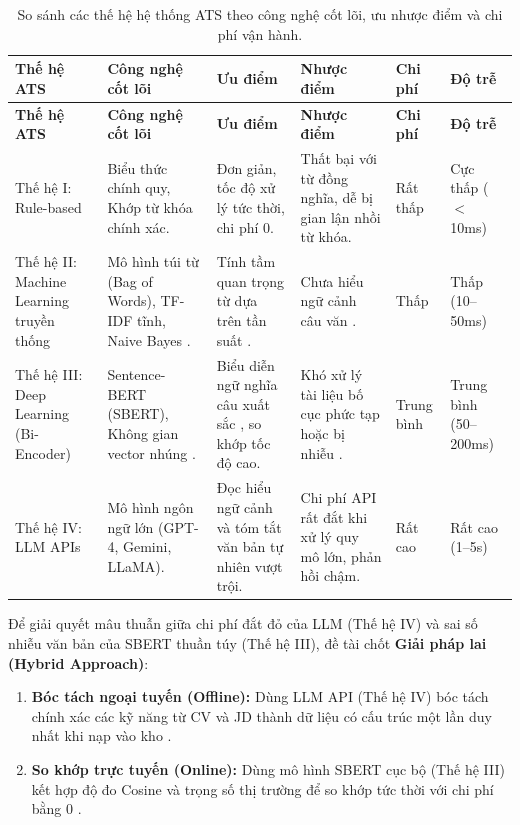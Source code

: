 \begingroup
\footnotesize
\begin{longtable}{|L{1.8cm}|L{2.3cm}|L{2.6cm}|L{2.6cm}|L{1.5cm}|L{1.6cm}|}
\caption{So sánh các thế hệ hệ thống ATS theo công nghệ cốt lõi, ưu nhược điểm và chi phí vận hành.}
\label{tab:ats_generations} \\
\hline
\textbf{Thế hệ ATS} & \textbf{Công nghệ cốt lõi} & \textbf{Ưu điểm} & \textbf{Nhược điểm} & \textbf{Chi phí} & \textbf{Độ trễ} \\
\hline
\endfirsthead
\hline
\textbf{Thế hệ ATS} & \textbf{Công nghệ cốt lõi} & \textbf{Ưu điểm} & \textbf{Nhược điểm} & \textbf{Chi phí} & \textbf{Độ trễ} \\
\hline
\endhead
Thế hệ I: Rule-based &
Biểu thức chính quy, Khớp từ khóa chính xác. &
Đơn giản, tốc độ xử lý tức thời, chi phí 0. &
Thất bại với từ đồng nghĩa, dễ bị gian lận nhồi từ khóa. &
Rất thấp &
Cực thấp ($<$10ms) \\
\hline
Thế hệ II: Machine Learning truyền thống &
Mô hình túi từ (Bag of Words), TF-IDF tĩnh, Naive Bayes \cite{manning2008}. &
Tính tầm quan trọng từ dựa trên tần suất \cite{manning2008}. &
Chưa hiểu ngữ cảnh câu văn \cite{reimers2019}. &
Thấp &
Thấp (10--50ms) \\
\hline
Thế hệ III: Deep Learning (Bi-Encoder) &
Sentence-BERT (SBERT), Không gian vector nhúng \cite{reimers2019}. &
Biểu diễn ngữ nghĩa câu xuất sắc \cite{minilmmodel}, so khớp tốc độ cao. &
Khó xử lý tài liệu bố cục phức tạp hoặc bị nhiễu \cite{reimers2019}. &
Trung bình &
Trung bình (50--200ms) \\
\hline
Thế hệ IV: LLM APIs &
Mô hình ngôn ngữ lớn (GPT-4, Gemini, LLaMA). &
Đọc hiểu ngữ cảnh và tóm tắt văn bản tự nhiên vượt trội. &
Chi phí API rất đắt khi xử lý quy mô lớn, phản hồi chậm. &
Rất cao &
Rất cao (1--5s) \\
\hline
\end{longtable}
\endgroup

Để giải quyết mâu thuẫn giữa chi phí đắt đỏ của LLM (Thế hệ IV) và sai số nhiễu văn bản của SBERT thuần túy (Thế hệ III), đề tài chốt \textbf{Giải pháp lai (Hybrid Approach)}:
\begin{enumerate}
    \item \textbf{Bóc tách ngoại tuyến (Offline):} Dùng LLM API (Thế hệ IV) bóc tách chính xác các kỹ năng từ CV và JD thành dữ liệu có cấu trúc một lần duy nhất khi nạp vào kho \cite{geministructured}.
    \item \textbf{So khớp trực tuyến (Online):} Dùng mô hình SBERT cục bộ (Thế hệ III) kết hợp độ đo Cosine và trọng số thị trường để so khớp tức thời với chi phí bằng 0 \cite{minilmmodel}.
\end{enumerate}

